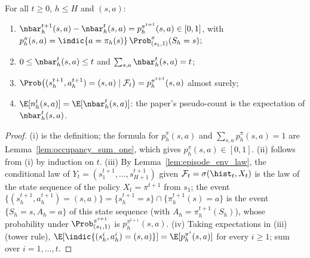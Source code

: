 \begin{lemma}\label{lem:pseudo_counts_increments}
\leanok
{}
For all $t \ge 0$, $h \le H$ and $(s, a)$:
\begin{enumerate}
  \item[(i)] $\nbar_h^{t+1}(s, a) - \nbar_h^t(s, a) = p^{\pi^{t+1}}_h(s, a) \in [0, 1]$, with
        $p^{\pi}_h(s, a) = \indic\{a = \pi_h(s)\}\, \Prob^\pi_{(s_1, 1)}(S_h = s)$;
  \item[(ii)] $0 \le \nbar_h^t(s, a) \le t$ and $\sum_{s, a} \nbar_h^t(s, a) = t$;
  \item[(iii)] $\Prob\big((s^{t+1}_h, a^{t+1}_h) = (s, a) \mid \mathcal F_t\big) = p^{\pi^{t+1}}_h(s, a)$
        almost surely;
  \item[(iv)] $\E[n_h^t(s, a)] = \E[\nbar_h^t(s, a)]$: the paper's pseudo-count is the expectation
        of $\nbar_h^t(s, a)$.
\end{enumerate}
\end{lemma}

\begin{proof}
\leanok
(i) is the definition; the formula for $p^\pi_h(s, a)$ and $\sum_{s, a} p^\pi_h(s, a) = 1$ are
Lemma~\ref{lem:occupancy_sum_one}, which gives $p^\pi_h(s, a) \in [0, 1]$. (ii) follows from
(i) by induction on $t$. (iii) By Lemma~\ref{lem:episode_env_law}, the conditional law of
$Y_t = (s^{t+1}_1, \dots, s^{t+1}_{H+1})$ given $\mathcal F_t = \sigma(\hist_t, X_t)$ is the law of
the state sequence of the policy $X_t = \pi^{t+1}$ from $s_1$; the event
$\{(s^{t+1}_h, a^{t+1}_h) = (s, a)\} = \{s^{t+1}_h = s\} \cap \{\pi^{t+1}_h(s) = a\}$ is the
event $\{S_h = s, A_h = a\}$ of this state sequence (with $A_h = \pi^{t+1}_h(S_h)$), whose
probability under $\Prob^{\pi^{t+1}}_{(s_1, 1)}$ is $p^{\pi^{t+1}}_h(s, a)$. (iv) Taking
expectations in (iii) (tower rule), $\E[\indic\{(s^{i}_h, a^{i}_h) = (s, a)\}] = \E[p^{\pi^{i}}_h(s, a)]$
for every $i \ge 1$; sum over $i = 1, \dots, t$.
\end{proof}

